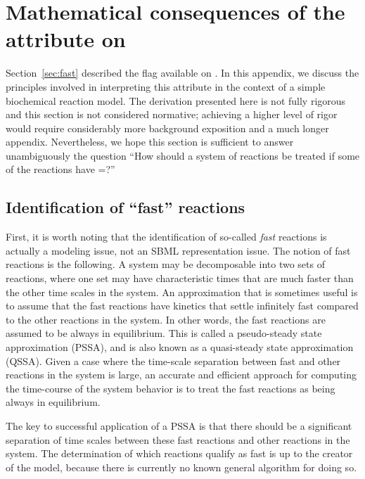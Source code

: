 
\section{Mathematical consequences of the  attribute on
  }
\label{apdx:consequences-of-being-fast}

Section~\ref{sec:fast} described the  flag available
on \Reaction.  In this appendix, we discuss the principles
involved in interpreting this attribute in the context of a simple
biochemical reaction model.  The derivation presented here is not
fully rigorous and this section is not considered normative;
achieving a higher level of rigor would require considerably more
background exposition and a much longer appendix.  Nevertheless,
we hope this section is sufficient to answer unambiguously the
question ``How should a system of reactions be treated if some of
the reactions have =?''


\subsection*{Identification of ``fast'' reactions}

First, it is worth noting that the identification of so-called
\emph{fast} reactions is actually a modeling issue, not an SBML
representation issue.  The notion of fast reactions is the
following.  A system may be decomposable into two sets of
reactions, where one set may have characteristic times that are
much faster than the other time scales in the system.  An
approximation that is sometimes useful is to assume that the fast
reactions have kinetics that settle infinitely fast compared to
the other reactions in the system.  In other words, the fast
reactions are assumed to be always in equilibrium.  This is called
a pseudo-steady state approximation (PSSA), and is also known as a
quasi-steady state approximation (QSSA).  Given a case where the
time-scale separation between fast and other reactions in the
system is large, an accurate and efficient approach for computing
the time-course of the system behavior is to treat the fast
reactions as being always in equilibrium.

The key to successful application of a PSSA is that there should
be a significant separation of time scales between these fast
reactions and other reactions in the system.  The determination of
which reactions qualify as fast is up to the creator of the model,
because there is currently no known general algorithm for doing
so.


